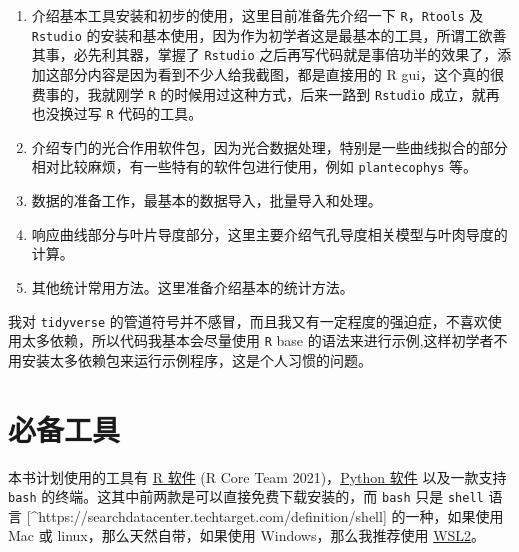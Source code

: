 \documentclass[
  letterpaper,
  DIV=11]{scrreport}
\begin{document}
\begin{enumerate}
\def\labelenumi{\arabic{enumi}.}
\item
  介绍基本工具安装和初步的使用，这里目前准备先介绍一下
  \texttt{R}，\texttt{Rtools} 及 \texttt{Rstudio}
  的安装和基本使用，因为作为初学者这是最基本的工具，所谓工欲善其事，必先利其器，掌握了
  \texttt{Rstudio}
  之后再写代码就是事倍功半的效果了，添加这部分内容是因为看到不少人给我截图，都是直接用的
  R gui，这个真的很费事的，我就刚学 \texttt{R}
  的时候用过这种方式，后来一路到 \texttt{Rstudio} 成立，就再也没换过写
  \texttt{R} 代码的工具。
\item
  介绍专门的光合作用软件包，因为光合数据处理，特别是一些曲线拟合的部分相对比较麻烦，有一些特有的软件包进行使用，例如
  \texttt{plantecophys} 等。
\item
  数据的准备工作，最基本的数据导入，批量导入和处理。
\item
  响应曲线部分与叶片导度部分，这里主要介绍气孔导度相关模型与叶肉导度的计算。
\item
  其他统计常用方法。这里准备介绍基本的统计方法。
\end{enumerate}

\begin{tcolorbox}[leftrule=.75mm, colback=white, coltitle=black, left=2mm, toptitle=1mm, toprule=.15mm, bottomtitle=1mm, colframe=quarto-callout-note-color, colbacktitle=quarto-callout-note-color!10!white, titlerule=0mm, rightrule=.15mm, title=\textcolor{quarto-callout-note-color}{\faInfo}\hspace{0.5em}注意, arc=.35mm, bottomrule=.15mm]
我对 \texttt{tidyverse}
的管道符号并不感冒，而且我又有一定程度的强迫症，不喜欢使用太多依赖，所以代码我基本会尽量使用
\texttt{R} base
的语法来进行示例,这样初学者不用安装太多依赖包来运行示例程序，这是个人习惯的问题。
\end{tcolorbox}

\part{必备工具}

本书计划使用的工具有 \href{https://cran.r-project.org/}{R 软件} (R Core
Team 2021)，\href{https://www.python.org/}{Python 软件} 以及一款支持
\texttt{bash} 的终端。这其中前两款是可以直接免费下载安装的，而
\texttt{bash} 只是 \texttt{shell} 语言
{[}\^{}https://searchdatacenter.techtarget.com/definition/shell{]}
的一种，如果使用 Mac 或 linux，那么天然自带，如果使用
Windows，那么我推荐使用
\href{https://docs.microsoft.com/en-us/windows/wsl/compare-versions}{WSL2}。
\end{document}
